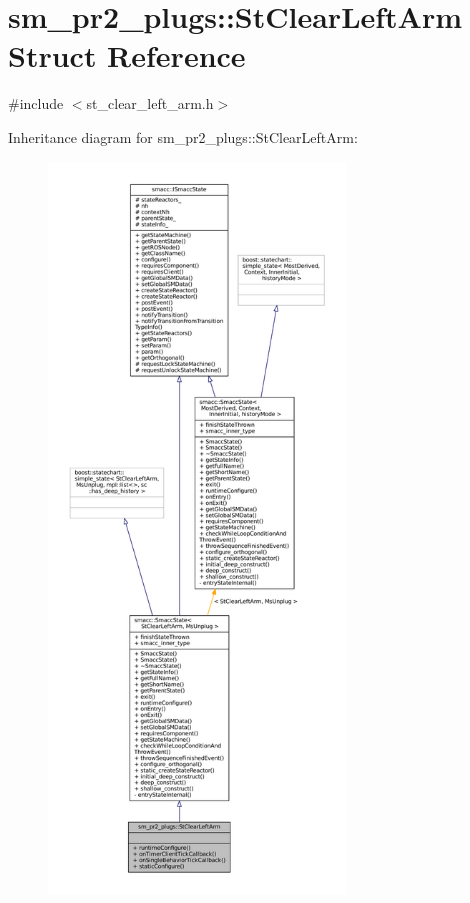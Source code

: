 \hypertarget{structsm__pr2__plugs_1_1StClearLeftArm}{}\section{sm\+\_\+pr2\+\_\+plugs\+:\+:St\+Clear\+Left\+Arm Struct Reference}
\label{structsm__pr2__plugs_1_1StClearLeftArm}


{\ttfamily \#include $<$st\+\_\+clear\+\_\+left\+\_\+arm.\+h$>$}



Inheritance diagram for sm\+\_\+pr2\+\_\+plugs\+:\+:St\+Clear\+Left\+Arm\+:
\nopagebreak
\begin{figure}[H]
\begin{center}
\leavevmode
\includegraphics[height=550pt]{structsm__pr2__plugs_1_1StClearLeftArm__inherit__graph}
\end{center}
\end{figure}


